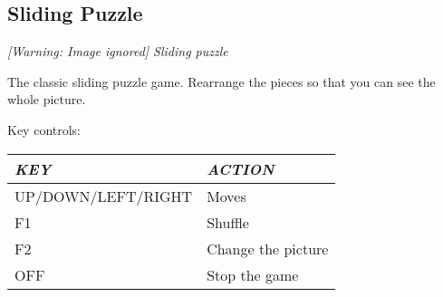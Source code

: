 \subsection{Sliding Puzzle}
{\centering\itshape
  [Warning: Image ignored] %
 \newline
Sliding puzzle
\par}

The classic sliding puzzle game.  Rearrange the pieces so that you can
see the whole picture.

Key controls:

\begin{center}\begin{tabular}{|p{4.7780004cm}|p{4.321cm}|}
\hline
{\centering\bfseries\itshape
KEY
\par}
&
{\centering\bfseries\itshape
ACTION
\par}
\\\hline
{\centering
UP/DOWN/LEFT/RIGHT
\par}
&
Moves
\\\hline
{\centering
F1
\par}
&
Shuffle
\\\hline
{\centering
F2
\par}
&
Change the picture
\\\hline
{\centering
OFF
\par}
&
Stop the game
\\\hline
\end{tabular}\end{center}


